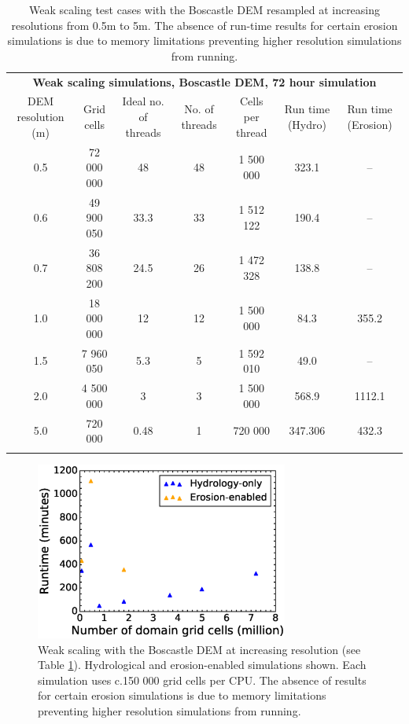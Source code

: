 \begin{table}[t]
\caption{Weak scaling test cases with the Boscastle DEM resampled at increasing resolutions from 0.5m to 5m. The absence of run-time results for certain erosion simulations is due to memory limitations preventing higher resolution simulations from running.}
\resizebox{\textwidth}{!}
{%
\begin{tabular}{ccccccc}

\multicolumn{7}{c}{\textbf{Weak scaling simulations, Boscastle DEM, 72 hour simulation}} \\ 

DEM resolution (m)  &  Grid cells & Ideal no. of threads & No. of threads & Cells per thread & Run time (Hydro) & Run time (Erosion) \\ 
\hline
0.5 & 72 000 000 & 48    & 48 &  1 500 000 & 323.1 & --  \\
0.6 & 49 900 050 & 33.3 & 33 &  1 512 122 & 190.4 & -- \\
0.7 & 36 808 200 & 24.5 & 26 &  1 472 328 & 138.8 & -- \\
1.0 & 18 000 000 & 12    & 12 &  1 500 000 & 84.3 & 355.2 \\
1.5 & 7 960 050   & 5.3   &  5  &   1 592 010 & 49.0 & -- \\
2.0 & 4 500 000   & 3      &  3  &   1 500 000 & 568.9 & 1112.1 \\
5.0 & 720 000      & 0.48 & 1  &    720 000 & 347.306 & 432.3 \\ 
\hline \\
\end{tabular} 
}
\label{weak_scale_table}
\end{table}

\begin{figure}[t]
\includegraphics[width=8.3cm]{chp05_figures_scripts/weak_scale_bos.eps}
\caption{Weak scaling with the Boscastle DEM at increasing resolution (see Table \ref{weak_scale_table}). Hydrological and erosion-enabled simulations shown. Each simulation uses c.150 000 grid cells per CPU. The absence of results for certain erosion simulations is due to memory limitations preventing higher resolution simulations from running.}
\label{fig_weak_scale}
\end{figure}


